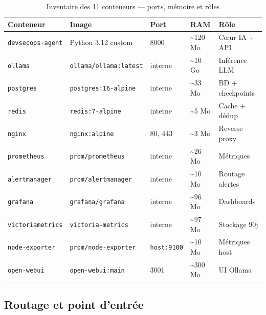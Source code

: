         \begin{table}[H]
        \centering
        \begin{tabular}{|m{3.5cm}|m{3cm}|m{2cm}|m{2cm}|m{2.5cm}|}
        \hline
        \textbf{Conteneur} & \textbf{Image} & \textbf{Port} & \textbf{RAM} & \textbf{Rôle} \\
        \hline
        \texttt{devsecops-agent} & Python 3.12 custom & 8000 & \textasciitilde120 Mo & Cœur IA + API \\
        \hline
        \texttt{ollama} & \texttt{ollama/\allowbreak{}ollama:latest} & interne & \textasciitilde10 Go & Inférence LLM \\
        \hline
        \texttt{postgres} & \texttt{postgres:\allowbreak{}16-alpine} & interne & \textasciitilde33 Mo & BD + checkpoints \\
        \hline
        \texttt{redis} & \texttt{redis:\allowbreak{}7-alpine} & interne & \textasciitilde5 Mo & Cache + dédup \\
        \hline
        \texttt{nginx} & \texttt{nginx:\allowbreak{}alpine} & 80, 443 & \textasciitilde3 Mo & Reverse proxy \\
        \hline
        \texttt{prometheus} & \texttt{prom/\allowbreak{}prometheus} & interne & \textasciitilde26 Mo & Métriques \\
        \hline
        \texttt{alertmanager} & \texttt{prom/\allowbreak{}alertmanager} & interne & \textasciitilde10 Mo & Routage alertes \\
        \hline
        \texttt{grafana} & \texttt{grafana/\allowbreak{}grafana} & interne & \textasciitilde96 Mo & Dashboards \\
        \hline
        \texttt{victoriametrics} & \texttt{victoria-\allowbreak{}metrics} & interne & \textasciitilde97 Mo & Stockage 90j \\
        \hline
        \texttt{node-exporter} & \texttt{prom/\allowbreak{}node-exporter} & \texttt{host:9100} & \textasciitilde10 Mo & Métriques host \\
        \hline
        \texttt{open-webui} & \texttt{open-\allowbreak{}webui:\allowbreak{}main} & 3001 & \textasciitilde300 Mo & UI Ollama \\
        \hline
        \end{tabular}
        \caption{Inventaire des 11 conteneurs — ports, mémoire et rôles}
        \label{tab:containers}
        \end{table}

    \subsection{Routage et point d'entrée}

